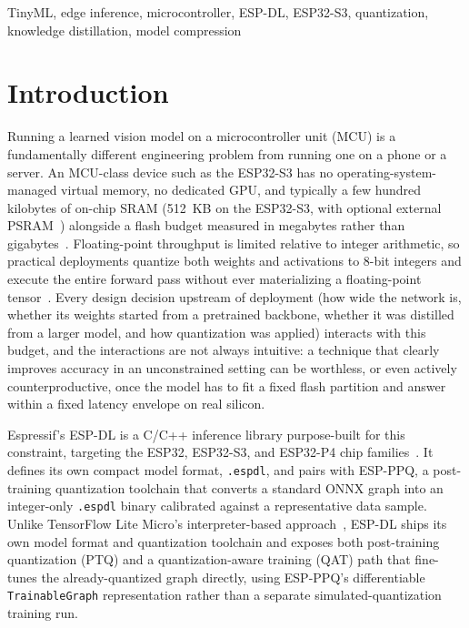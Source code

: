 \documentclass[conference]{IEEEtran}
\begin{document}
	\begin{IEEEkeywords}
		TinyML, edge inference, microcontroller, ESP-DL, ESP32-S3, quantization, knowledge
		distillation, model compression
	\end{IEEEkeywords}
	
	\section{Introduction}
	
	Running a learned vision model on a microcontroller unit (MCU) is a fundamentally different
	engineering problem from running one on a phone or a server. An MCU-class device such as the
	ESP32-S3 has no operating-system-managed virtual memory, no dedicated GPU, and typically a few
	hundred kilobytes of on-chip SRAM (512~KB on the ESP32-S3, with optional external PSRAM~\cite{esp32s3ds}) alongside a flash budget measured in
	megabytes rather than gigabytes~\cite{david2021tflm,lin2020mcunet}. Floating-point throughput
	is limited relative to integer arithmetic, so practical deployments quantize both weights and
	activations to 8-bit integers and execute the entire forward pass without ever materializing a
	floating-point tensor~\cite{jacob2018quantization}. Every design decision upstream of
	deployment (how wide the network is, whether its weights started from a pretrained backbone,
	whether it was distilled from a larger model, and how quantization was applied) interacts
	with this budget, and the interactions are not always intuitive: a technique that clearly
	improves accuracy in an unconstrained setting can be worthless, or even actively
	counterproductive, once the model has to fit a fixed flash partition and answer within a fixed
	latency envelope on real silicon.
	
	Espressif's ESP-DL is a C/C++ inference library purpose-built for this constraint, targeting
	the ESP32, ESP32-S3, and ESP32-P4 chip families~\cite{espdlguide}. It defines its own compact model
	format, \texttt{.espdl}, and pairs with ESP-PPQ, a post-training quantization toolchain that
	converts a standard ONNX graph into an integer-only \texttt{.espdl} binary calibrated against a
	representative data sample. Unlike TensorFlow Lite Micro's interpreter-based
	approach~\cite{david2021tflm}, ESP-DL ships its own model format and quantization toolchain and
	exposes both post-training quantization (PTQ) and a quantization-aware training (QAT) path that
	fine-tunes the already-quantized graph directly, using ESP-PPQ's differentiable
	\texttt{TrainableGraph} representation rather than a separate simulated-quantization training
	run.
	
\end{document}
